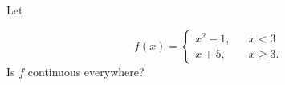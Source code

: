 \documentclass{ximera}
\author{Gregory Hartman \and Matthew Carr}
\begin{document}
\begin{exercise}



Let

\[
f(x) = \left\{
                 \begin{array}{ccc} x^2-1, & & x < 3 \\
                 x+5, & & x\geq 3.
                  \end{array}
         \right.
\]
Is $f$ continuous everywhere? 

\begin{prompt}
\begin{multipleChoice}
\end{multipleChoice}
\end{prompt}

\end{exercise}
\end{document}
